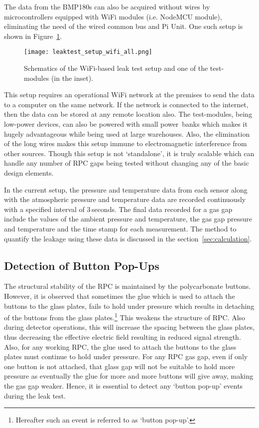 The data from the BMP180s can also be acquired without wires by
microcontrollers equipped with WiFi modules (i.e. NodeMCU
module\cite{nodemcu2015}), eliminating the need of the wired common bus and
Pi Unit. One such setup is shown in Figure~\ref{fig:leakwifi}. 
\begin{figure}
  \centering
  \texttt{[image: leaktest\_setup\_wifi\_all.png]}
  \caption{Schematics of the WiFi-based leak test setup and one of the
    test-modules (in the inset).}
  \label{fig:leakwifi}
\end{figure}
This setup requires an operational WiFi network at the premises to send the
data to a computer on the same network. If the network is connected to the
internet, then the data can be stored at any remote location also. The
test-modules, being low-power devices, can also be powered with small
power~banks which makes it hugely advantageous while being used at large
warehouses. Also, the elimination of the long wires makes this setup immune
to electromagnetic interference from other sources. Though this setup is not
`standalone', it is truly scalable which can handle any number of RPC gaps
being tested without changing any of the basic design elements.

In the current setup, the pressure and temperature data from each
sensor along with the atmospheric pressure and temperature data are
recorded continuously with a specified interval of $3$\,seconds.
The final data recorded for a gas gap include the values of the
ambient pressure and temperature, the gas gap pressure and temperature
and the time stamp for each measurement.
The method to quantify the leakage using these data is discussed in the
section~\ref{sec:calculation}.

\subsection{Detection of Button Pop-Ups}\label{sec:button}
The structural stability of the RPC is maintained by the polycarbonate
buttons. However, it is observed that sometimes the glue which is used
to attach the buttons to the glass plates, fails to hold under
pressure which results in detaching of the buttons from the glass
plates.\footnote{Hereafter such an event is referred to as
  `button pop-up'.}
This weakens the structure of RPC. Also during detector operations,
this will increase the spacing between the glass plates, thus
decreasing the effective electric field resulting in reduced signal
strength. Also, for any working RPC, the glue used to attach the
buttons to the glass plates must continue to hold under pressure.
For any RPC gas gap, even if only one button is not attached, that
glass gap will not be suitable to hold more pressure as eventually the
glue for more and more buttons will give away, making the gas gap
weaker. Hence, it is essential to detect any `button pop-up' events
during the leak test.

